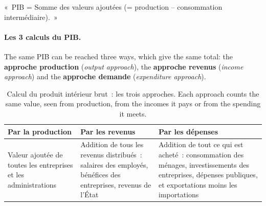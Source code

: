 \begin{remark}
  «~PIB = Somme des valeurs ajoutées (= production -- consommation
  intermédiaire).~»
\end{remark}

\paragraph{Les 3 calculs du PIB.} The same PIB can be reached three ways, which
give the same total: the \textbf{approche production} (\textit{output
approach}), the \textbf{approche revenus} (\textit{income approach}) and the
\textbf{approche demande} (\textit{expenditure approach}).

\begin{table}[h!]
  \centering
  \small
  \begin{tabularx}{\textwidth}{@{}*{3}{>{\raggedright\arraybackslash}X}@{}}
    \toprule
    Par la production & Par les revenus & Par les dépenses \\
    \midrule
    Valeur ajoutée de toutes les entreprises et les administrations
    & Addition de tous les revenus distribués~: salaires des employés,
      bénéfices des entreprises, revenus de l'État
    & Addition de tout ce qui est acheté~: consommation des ménages,
      investissements des entreprises, dépenses publiques, et exportations moins
      les importations \\
    \bottomrule
  \end{tabularx}
  \caption*{\small Calcul du produit intérieur brut~: les trois approches.
    Each approach counts the same value, seen from production, from the incomes
    it pays or from the spending it meets.}
\end{table}


